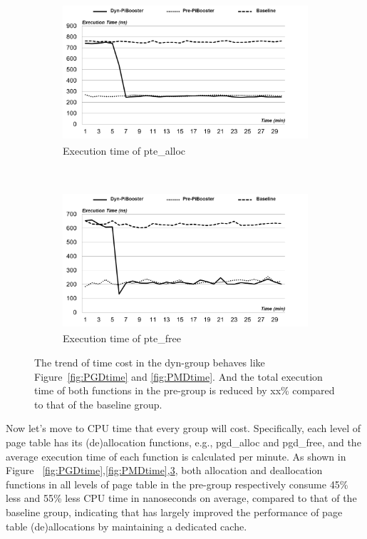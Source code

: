 \begin{figure}[t!]
    \centering
    \begin{subfigure}[t]{0.5\textwidth}
        \centering
        \includegraphics[height=2.0in]{image/micro/PTEalloc.png}
        \caption{Execution time of pte\_alloc}
        \label{fig:subfig:a}
    \end{subfigure}%
    ~
    \begin{subfigure}[t]{0.5\textwidth}
        \centering
        \includegraphics[height=2.0in]{image/micro/PTEfree.png}
        \caption{Execution time of pte\_free}
        \label{fig:subfig:b}
    \end{subfigure}
    \caption{The trend of time cost in the dyn-\name group behaves like Figure~\ref{fig:PGDtime} and \ref{fig:PMDtime}. And the total execution time of both functions in the pre-\name group is reduced by xx\% compared to that of the baseline group.}
    \label{fig:PTEtime}
\end{figure}

Now let’s move to CPU time that every group will cost. Specifically, each level of page table has its (de)allocation functions, e.g., pgd\_alloc and pgd\_free, and the average execution time of each function is calculated per minute. As shown in Figure~ \ref{fig:PGDtime},\ref{fig:PMDtime},\ref{fig:PTEtime}, both allocation and deallocation functions in all levels of page table in the pre-\name group respectively consume 45\% less and 55\% less CPU time in nanoseconds on average, compared to that of the baseline group, indicating that \name has largely improved the performance of page table (de)allocations by maintaining a dedicated cache.

